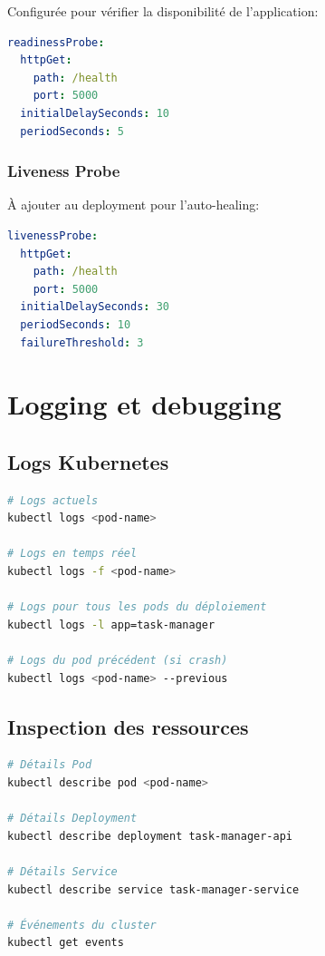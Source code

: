 \documentclass[12pt,a4paper,twoside]{report}
\begin{document}
Configurée pour vérifier la disponibilité de l'application:

\begin{lstlisting}[language=yaml]
readinessProbe:
  httpGet:
    path: /health
    port: 5000
  initialDelaySeconds: 10
  periodSeconds: 5
\end{lstlisting}

\subsubsection{Liveness Probe}

À ajouter au deployment pour l'auto-healing:

\begin{lstlisting}[language=yaml]
livenessProbe:
  httpGet:
    path: /health
    port: 5000
  initialDelaySeconds: 30
  periodSeconds: 10
  failureThreshold: 3
\end{lstlisting}

\section{Logging et debugging}

\subsection{Logs Kubernetes}

\begin{lstlisting}[language=bash]
# Logs actuels
kubectl logs <pod-name>

# Logs en temps réel
kubectl logs -f <pod-name>

# Logs pour tous les pods du déploiement
kubectl logs -l app=task-manager

# Logs du pod précédent (si crash)
kubectl logs <pod-name> --previous
\end{lstlisting}

\subsection{Inspection des ressources}

\begin{lstlisting}[language=bash]
# Détails Pod
kubectl describe pod <pod-name>

# Détails Deployment
kubectl describe deployment task-manager-api

# Détails Service
kubectl describe service task-manager-service

# Événements du cluster
kubectl get events
\end{lstlisting}
\end{document}
